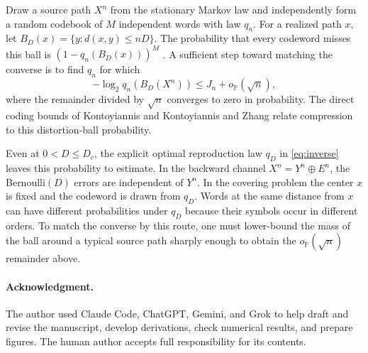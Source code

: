 \documentclass[11pt,letterpaper]{article}
\theoremstyle{definition}
\newcommand{\Prb}{\mathbb P}
\begin{document}
Draw a source path $X^n$ from the stationary Markov law and independently form a random codebook of $M$ independent words with law $q_n$. For a realized path $x$, let $B_D(x)=\{y:d(x,y)\le nD\}$. The probability that every codeword misses this ball is $(1-q_n(B_D(x)))^M$ \cite[Thms.~9--10]{kv}. A sufficient step toward matching the converse is to find $q_n$ for which
\[
 -\log_2 q_n(B_D(X^n))\le J_n+o_{\Prb}(\sqrt n),
\]
where the remainder divided by $\sqrt n$ converges to zero in probability. The direct coding bounds of Kontoyiannis \cite{konto00} and Kontoyiannis and Zhang \cite{kz02} relate compression to this distortion-ball probability.

Even at $0<D\le D_c$, the explicit optimal reproduction law $q_D$ in \eqref{eq:inverse} leaves this probability to estimate. In the backward channel $X^n=Y^n\oplus E^n$, the Bernoulli$(D)$ errors are independent of $Y^n$. In the covering problem the center $x$ is fixed and the codeword is drawn from $q_D$. Words at the same distance from $x$ can have different probabilities under $q_D$ because their symbols occur in different orders. To match the converse by this route, one must lower-bound the mass of the ball around a typical source path sharply enough to obtain the $o_{\Prb}(\sqrt n)$ remainder above.

\paragraph{Acknowledgment.}
The author used Claude Code, ChatGPT, Gemini, and Grok to help draft and revise the manuscript, develop derivations, check numerical results, and prepare figures. The human author accepts full responsibility for its contents.
\end{document}
